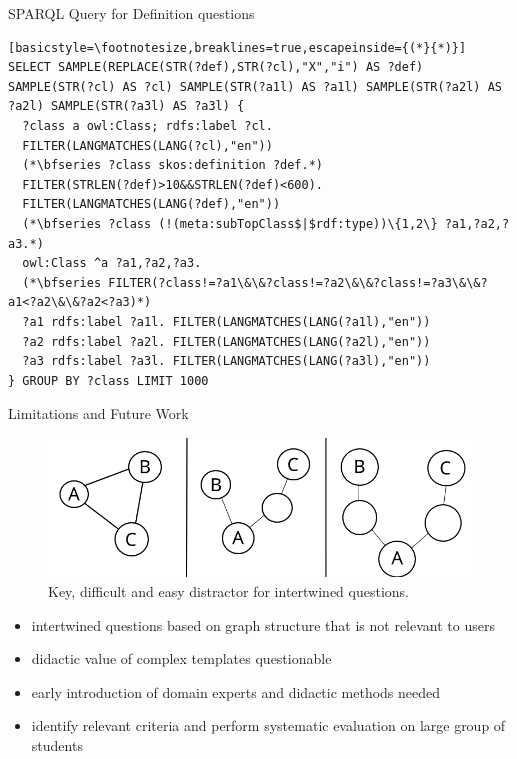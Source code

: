 \documentclass[aspectratio=1610,12pt]{beamer}
\begin{document}
\begin{frame}[fragile]{SPARQL Query for Definition questions}
\begin{lstlisting}[basicstyle=\footnotesize,breaklines=true,escapeinside={(*}{*)}]
SELECT SAMPLE(REPLACE(STR(?def),STR(?cl),"X","i") AS ?def) SAMPLE(STR(?cl) AS ?cl) SAMPLE(STR(?a1l) AS ?a1l) SAMPLE(STR(?a2l) AS ?a2l) SAMPLE(STR(?a3l) AS ?a3l) {
  ?class a owl:Class; rdfs:label ?cl.
  FILTER(LANGMATCHES(LANG(?cl),"en"))
  (*\bfseries ?class skos:definition ?def.*)
  FILTER(STRLEN(?def)>10&&STRLEN(?def)<600).
  FILTER(LANGMATCHES(LANG(?def),"en"))
  (*\bfseries ?class (!(meta:subTopClass$|$rdf:type))\{1,2\} ?a1,?a2,?a3.*)
  owl:Class ^a ?a1,?a2,?a3.
  (*\bfseries FILTER(?class!=?a1\&\&?class!=?a2\&\&?class!=?a3\&\&?a1<?a2\&\&?a2<?a3)*)
  ?a1 rdfs:label ?a1l. FILTER(LANGMATCHES(LANG(?a1l),"en"))
  ?a2 rdfs:label ?a2l. FILTER(LANGMATCHES(LANG(?a2l),"en"))
  ?a3 rdfs:label ?a3l. FILTER(LANGMATCHES(LANG(?a3l),"en"))
} GROUP BY ?class LIMIT 1000
\end{lstlisting}
\end{frame}

\begin{frame}[fragile]{Limitations and Future Work}
\begin{figure}
\centering\includegraphics[height=0.3\textheight,keepaspectratio]{img/intertwined_cml.png}
\caption{Key, difficult and easy distractor for intertwined questions.}
\end{figure}
\begin{itemize}
\item intertwined questions based on graph structure that is not relevant to users
\item didactic value of complex templates questionable\pause
\item early introduction of domain experts and didactic methods needed\pause
\item identify relevant criteria and perform systematic evaluation on large group of students
\end{itemize}
\end{frame}
\end{document}
